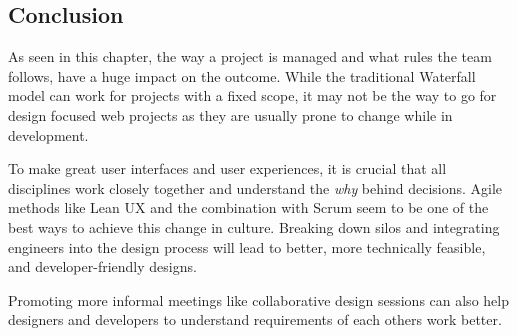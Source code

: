 \newpage
\subsection{Conclusion}

As seen in this chapter, the way a project is managed and what rules the team follows, have 
a huge impact on the outcome. While the traditional Waterfall model can work for projects with a
fixed scope, it may not be the way to go for design focused web projects as they are usually prone
to change while in development.

To make great user interfaces and user experiences, it is crucial that all disciplines work closely
together and understand the \textit{why} behind decisions. Agile methods like Lean UX and the
combination with Scrum seem to be one of the best ways to achieve this change in culture.
Breaking down silos and integrating engineers into the design process will lead to better, more
technically feasible, and developer-friendly designs. 

Promoting more informal meetings like collaborative design sessions can also help designers and
developers to understand requirements of each others work better. 
